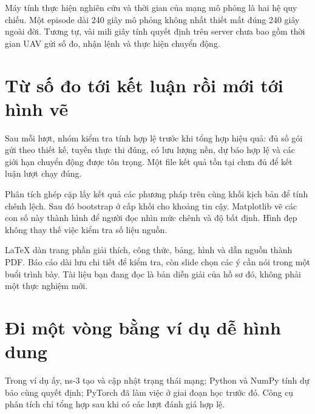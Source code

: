 Máy tính thực hiện nghiên cứu và thời gian của mạng mô phỏng là hai hệ quy chiếu. Một episode dài 240 giây mô phỏng không nhất thiết mất đúng 240 giây ngoài đời. Tương tự, vài mili giây tính quyết định trên server chưa bao gồm thời gian UAV gửi số đo, nhận lệnh và thực hiện chuyển động.

\section{Từ số đo tới kết luận rồi mới tới hình vẽ}
Sau mỗi lượt, nhóm kiểm tra tính hợp lệ trước khi tổng hợp hiệu quả: đủ số gói gửi theo thiết kế, tuyến thực thi đúng, có lưu lượng nền, dự báo hợp lệ và các giới hạn chuyển động được tôn trọng. Một file kết quả tồn tại chưa đủ để kết luận lượt chạy đúng.

Phân tích ghép cặp lấy kết quả các phương pháp trên cùng khối kịch bản để tính chênh lệch. Sau đó bootstrap ở cấp khối cho khoảng tin cậy. Matplotlib vẽ các con số này thành hình để người đọc nhìn mức chênh và độ bất định. Hình đẹp không thay thế việc kiểm tra số liệu nguồn.

LaTeX dàn trang phần giải thích, công thức, bảng, hình và dẫn nguồn thành PDF. Báo cáo dài lưu chi tiết để kiểm tra, còn slide chọn các ý cần nói trong một buổi trình bày. Tài liệu bạn đang đọc là bản diễn giải của hồ sơ đó, không phải một thực nghiệm mới.

\section{Đi một vòng bằng ví dụ dễ hình dung}

Trong ví dụ ấy, ns-3 tạo và cập nhật trạng thái mạng; Python và NumPy tính dự báo cùng quyết định; PyTorch đã làm việc ở giai đoạn học trước đó. Công cụ phân tích chỉ tổng hợp sau khi có các lượt đánh giá hợp lệ.

